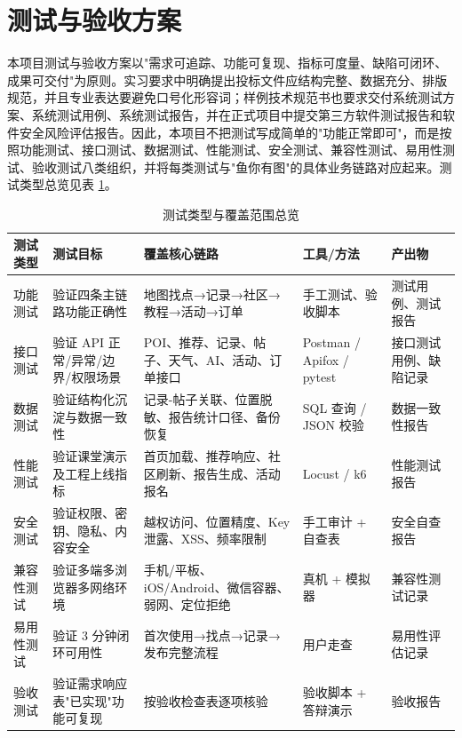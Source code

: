 \section{测试与验收方案}

本项目测试与验收方案以"需求可追踪、功能可复现、指标可度量、缺陷可闭环、成果可交付"为原则。实习要求中明确提出投标文件应结构完整、数据充分、排版规范，并且专业表达要避免口号化形容词；样例技术规范书也要求交付系统测试方案、系统测试用例、系统测试报告，并在正式项目中提交第三方软件测试报告和软件安全风险评估报告。因此，本项目不把测试写成简单的"功能正常即可"，而是按照功能测试、接口测试、数据测试、性能测试、安全测试、兼容性测试、易用性测试、验收测试八类组织，并将每类测试与"鱼你有图"的具体业务链路对应起来。测试类型总览见表 \ref{tab:test-types}。

\begin{table}[htbp]
  \centering\small
  \caption{测试类型与覆盖范围总览}
  \label{tab:test-types}
  \begin{tabularx}{\textwidth}{>{\raggedright\arraybackslash}p{1.8cm}|>{\raggedright\arraybackslash}p{2.5cm}|X|>{\raggedright\arraybackslash}p{2.4cm}|>{\raggedright\arraybackslash}p{2.0cm}}
    \toprule
    \textbf{测试类型} & \textbf{测试目标} & \textbf{覆盖核心链路} & \textbf{工具/方法} & \textbf{产出物} \\
    \midrule
    功能测试 & 验证四条主链路功能正确性 & 地图找点→记录→社区→教程→活动→订单 & 手工测试、验收脚本 & 测试用例、测试报告 \\
    \hline
    接口测试 & 验证 API 正常/异常/边界/权限场景 & POI、推荐、记录、帖子、天气、AI、活动、订单接口 & Postman / Apifox / pytest & 接口测试用例、缺陷记录 \\
    \hline
    数据测试 & 验证结构化沉淀与数据一致性 & 记录-帖子关联、位置脱敏、报告统计口径、备份恢复 & SQL 查询 / JSON 校验 & 数据一致性报告 \\
    \hline
    性能测试 & 验证课堂演示及工程上线指标 & 首页加载、推荐响应、社区刷新、报告生成、活动报名 & Locust / k6 & 性能测试报告 \\
    \hline
    安全测试 & 验证权限、密钥、隐私、内容安全 & 越权访问、位置精度、Key 泄露、XSS、频率限制 & 手工审计 + 自查表 & 安全自查报告 \\
    \hline
    兼容性测试 & 验证多端多浏览器多网络环境 & 手机/平板、iOS/Android、微信容器、弱网、定位拒绝 & 真机 + 模拟器 & 兼容性测试记录 \\
    \hline
    易用性测试 & 验证 3 分钟闭环可用性 & 首次使用→找点→记录→发布完整流程 & 用户走查 & 易用性评估记录 \\
    \hline
    验收测试 & 验证需求响应表"已实现"功能可复现 & 按验收检查表逐项核验 & 验收脚本 + 答辩演示 & 验收报告 \\
    \bottomrule
  \end{tabularx}
\end{table}

